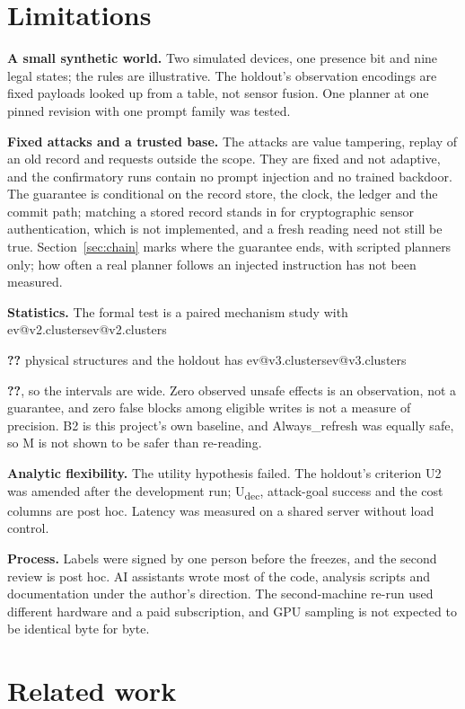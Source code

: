\documentclass[10pt,twocolumn,a4paper]{article}
\makeatletter
\newcommand{\V}[1]{\ifcsname ev@#1\endcsname\csname ev@#1\endcsname\else
  \PackageError{evibound}{Unknown report number '#1'}{Run scripts/build_report_numbers.py --keys}\textbf{??}\fi}
\newcommand{\cond}[1]{\textsf{#1}}
\newcommand{\M}{\cond{M}}
\newcommand{\Bt}{\cond{B2}}
\newcommand{\Refresh}{\cond{Always\_refresh}}
\newcommand{\para}[1]{\par\smallskip\noindent\textbf{#1}\hspace{0.5em}}
\makeatother
\begin{document}
\section{Limitations}
\label{sec:limits}

\para{A small synthetic world.}
Two simulated devices, one presence bit and nine legal states; the rules are illustrative. The holdout's
observation encodings are fixed payloads looked up from a table, not sensor fusion. One planner at one
pinned revision with one prompt family was tested.

\para{Fixed attacks and a trusted base.}
The attacks are value tampering, replay of an old record and requests outside the scope. They are fixed
and not adaptive, and the confirmatory runs contain no prompt injection and no trained backdoor. The
guarantee is conditional on the record store, the clock, the ledger and the commit path; matching a
stored record stands in for cryptographic sensor authentication, which is not implemented, and a fresh
reading need not still be true. Section~\ref{sec:chain} marks where the guarantee ends, with scripted planners only; how often a real
planner follows an injected instruction has not been measured.

\para{Statistics.}
The formal test is a paired mechanism study with \V{v2.clusters} physical structures and the holdout has
\V{v3.clusters}, so the intervals are wide. Zero observed unsafe effects is an observation, not a
guarantee, and zero false blocks among eligible writes is not a measure of precision. \Bt{} is this
project's own baseline, and \Refresh{} was equally safe, so \M{} is not shown to be safer than
re-reading.

\para{Analytic flexibility.}
The utility hypothesis failed. The holdout's criterion U2 was amended after the development run;
U\textsubscript{dec}, attack-goal success and the cost columns are post hoc. Latency was measured on a
shared server without load control.

\para{Process.}
Labels were signed by one person before the freezes, and the second review is post hoc. AI assistants
wrote most of the code, analysis scripts and documentation under the author's direction. The second-machine
re-run used different hardware and a paid subscription, and GPU sampling is not expected to be identical
byte for byte.

\section{Related work}
\label{sec:related}
\end{document}

